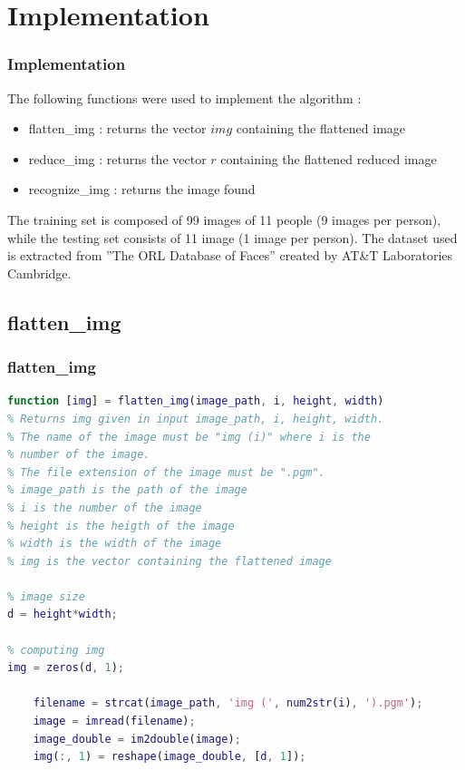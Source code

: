 \documentclass[10pt]{beamer}
\begin{document}
\section{Implementation}
\begin{frame}
    \frametitle{Implementation}
    The following functions were used to implement the algorithm : 

    \begin{itemize}
        \item flatten\_img : returns the vector $ img $ containing the flattened image
        \item reduce\_img : returns the vector $ r $ containing the flattened reduced image
        \item recognize\_img : returns the image found 
    \end{itemize}

    \vspace{5 pt}

    The training set is composed of 99 images of 11 people (9 images per person), while the testing set consists of 11 image (1 image per person).   
    The dataset used is extracted from ”The ORL Database of Faces” created by AT\&T Laboratories Cambridge.
    
\end{frame}

\subsection{flatten\_img}
    \begin{frame}[fragile]
        \frametitle{flatten\_img}

        \begin{lstlisting}[language=Matlab, numbers=none]
function [img] = flatten_img(image_path, i, height, width)
% Returns img given in input image_path, i, height, width.
% The name of the image must be "img (i)" where i is the 
% number of the image.
% The file extension of the image must be ".pgm".
% image_path is the path of the image 
% i is the number of the image
% height is the heigth of the image
% width is the width of the image
% img is the vector containing the flattened image
 
% image size
d = height*width;

% computing img
img = zeros(d, 1);

    filename = strcat(image_path, 'img (', num2str(i), ').pgm');
    image = imread(filename);
    image_double = im2double(image);
    img(:, 1) = reshape(image_double, [d, 1]);

        \end{lstlisting}
        
    \end{frame}
\end{document}
